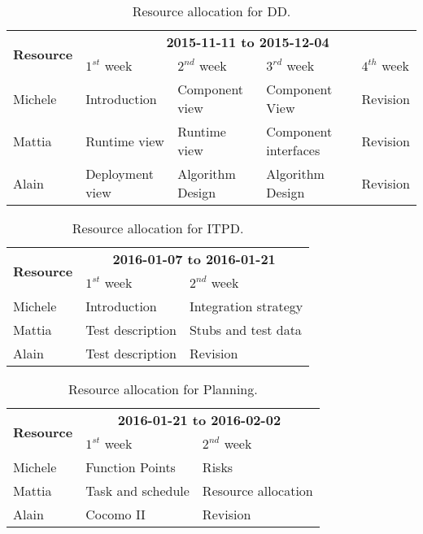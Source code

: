 \begin{table}
    \centering
    \begin{small}
    \begin{tabular}{| l | l | l | l | l |}
        \hline
        \multirow{2}{*}{\textbf{Resource}} & \multicolumn{4}{c|}{\textbf{2015-11-11 to 2015-12-04}} \\
        \cline{2-5}
        & $1^{st}$ week & $2^{nd}$ week & $3^{rd} $ week & $4^{th}$ week\\
        \hline
        Michele        & Introduction      & Component view     & Component View & Revision   \\
        Mattia         & Runtime view      & Runtime view       & Component interfaces & Revision   \\
        Alain          & Deployment view   & Algorithm Design   & Algorithm Design & Revision  \\
        \hline
    \end{tabular}
    \end{small}
    \caption{Resource allocation for DD.}
    \label{tab:dd-res-alloc}
\end{table}

\begin{table}
    \centering
    \begin{tabular}{| l | l | l |}
        \hline
        \multirow{2}{*}{\textbf{Resource}} & \multicolumn{2}{c|}{\textbf{2016-01-07 to 2016-01-21}} \\
        \cline{2-3}
        & $1^{st}$ week & $2^{nd}$ week \\
        \hline
        Michele        & Introduction        & Integration strategy       \\
        Mattia         & Test description    & Stubs and test data    \\
        Alain          & Test description    & Revision    \\
        \hline
    \end{tabular}
    \caption{Resource allocation for ITPD.}
    \label{tab:itpd-res-alloc}
\end{table}

\begin{table}
    \centering
    \begin{tabular}{| l | l | l |}
        \hline
        \multirow{2}{*}{\textbf{Resource}} & \multicolumn{2}{c|}{\textbf{2016-01-21 to 2016-02-02}} \\
        \cline{2-3}
        & $1^{st}$ week & $2^{nd}$ week \\
        \hline
        Michele        & Function Points       & Risks      \\
        Mattia         & Task and schedule     & Resource allocation    \\
        Alain          & Cocomo II             & Revision    \\
        \hline
    \end{tabular}
    \caption{Resource allocation for Planning.}
    \label{tab:plan-res-alloc}
\end{table}

